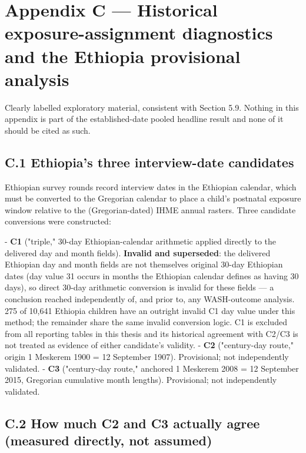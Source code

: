 \section*{Appendix C --- Historical exposure-assignment diagnostics and the Ethiopia provisional analysis}

Clearly labelled exploratory material, consistent with Section 5.9. Nothing in this appendix is part of the established-date pooled headline result and none of it should be cited as such.

\subsection*{C.1 Ethiopia's three interview-date candidates}

Ethiopian survey rounds record interview dates in the Ethiopian calendar, which must be converted to the Gregorian calendar to place a child's postnatal exposure window relative to the (Gregorian-dated) IHME annual rasters. Three candidate conversions were constructed:

- \textbf{C1} ("triple," 30-day Ethiopian-calendar arithmetic applied directly to the delivered day and month fields). \textbf{Invalid and superseded}: the delivered Ethiopian day and month fields are not themselves original 30-day Ethiopian dates (day value 31 occurs in months the Ethiopian calendar defines as having 30 days), so direct 30-day arithmetic conversion is invalid for these fields --- a conclusion reached independently of, and prior to, any WASH-outcome analysis. 275 of 10,641 Ethiopia children have an outright invalid C1 day value under this method; the remainder share the same invalid conversion logic. C1 is excluded from all reporting tables in this thesis and its historical agreement with C2/C3 is not treated as evidence of either candidate's validity.
- \textbf{C2} ("century-day route," origin 1 Meskerem 1900 = 12 September 1907). Provisional; not independently validated.
- \textbf{C3} ("century-day route," anchored 1 Meskerem 2008 = 12 September 2015, Gregorian cumulative month lengths). Provisional; not independently validated.

\subsection*{C.2 How much C2 and C3 actually agree (measured directly, not assumed)}

